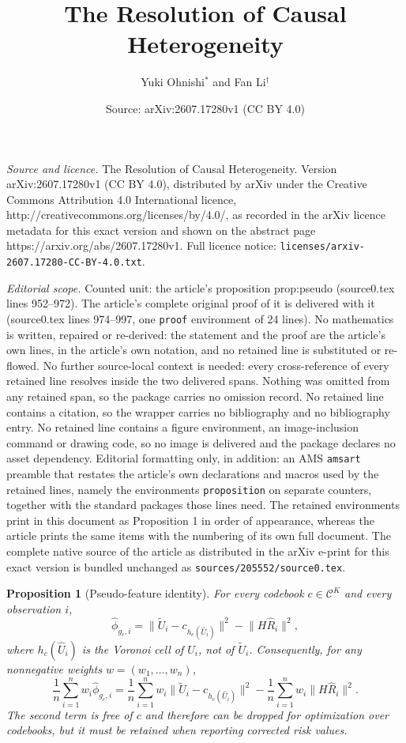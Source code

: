 \documentclass[10pt,a4paper]{amsart}
\title{The Resolution of Causal Heterogeneity}
\author{Yuki Ohnishi$^{*}$ and Fan Li$^{\dagger}$}
\date{Source: arXiv:2607.17280v1 (CC BY 4.0)}
\newtheorem{proposition}{Proposition}
\newcommand{\calC}{\mathcal C}
\newcommand{\hR}{\widehat R}
\newcommand{\hU}{\widehat U}
\newcommand{\hphi}{\widehat\phi}
\newcommand{\tU}{\widetilde U}
\begin{document}
\maketitle

\noindent\emph{Source and licence.} The Resolution of Causal Heterogeneity. Version arXiv:2607.17280v1 (CC BY 4.0), distributed by arXiv under the Creative Commons Attribution 4.0 International licence, http://creativecommons.org/licenses/by/4.0/, as recorded in the arXiv licence metadata for this exact version and shown on the abstract page https://arxiv.org/abs/2607.17280v1. Full licence notice: \texttt{licenses/arxiv-2607.17280-CC-BY-4.0.txt}.\par\smallskip

\noindent\textit{Editorial scope.} Counted unit: the article's proposition prop:pseudo (source0.tex lines 952--972). The article's complete original proof of it is delivered with it (source0.tex lines 974--997, one \texttt{proof} environment of 24 lines). No mathematics is written, repaired or re-derived: the statement and the proof are the article's own lines, in the article's own notation, and no retained line is substituted or re-flowed.  No further source-local context is needed: every cross-reference of every retained line resolves inside the two delivered spans.  Nothing was omitted from any retained span, so the package carries no omission record.  No retained line contains a citation, so the wrapper carries no bibliography and no bibliography entry.  No retained line contains a figure environment, an image-inclusion command or drawing code, so no image is delivered and the package declares no asset dependency.  Editorial formatting only, in addition: an AMS \texttt{amsart} preamble that restates the article's own declarations and macros used by the retained lines, namely the environments \texttt{proposition} on separate counters, together with the standard packages those lines need.  The retained environments print in this document as Proposition 1 in order of appearance, whereas the article prints the same items with the numbering of its own full document.  The complete native source of the article as distributed in the arXiv e-print for this exact version is bundled unchanged as \texttt{sources/205552/source0.tex}.
\begin{proposition}[Pseudo-feature identity]\label{prop:pseudo}
For every codebook $c\in\calC^K$ and every observation $i$,
\begin{equation}\label{eq:pseudoidentity}
\hphi_{g_c,i}
=
\bigl\|\tU_i-c_{h_c(\hU_i)}\bigr\|^2
-
\bigl\|H\hR_i\bigr\|^2,
\end{equation}
where $h_c(\hU_i)$ is the Voronoi cell of $\hU_i$, not of $\tU_i$.  Consequently, for any nonnegative weights $w=(w_1,\dots,w_n)$,
\begin{equation}\label{eq:pseudoweighted}
\frac1n\sum_{i=1}^n w_i\hphi_{g_c,i}
=
\frac1n\sum_{i=1}^n w_i
\bigl\|\tU_i-c_{h_c(\hU_i)}\bigr\|^2
-
\frac1n\sum_{i=1}^n w_i
\bigl\|H\hR_i\bigr\|^2 .
\end{equation}
The second term is free of $c$ and therefore can be dropped for optimization over codebooks, but it must be retained when reporting corrected risk values.
\end{proposition}
\end{document}

